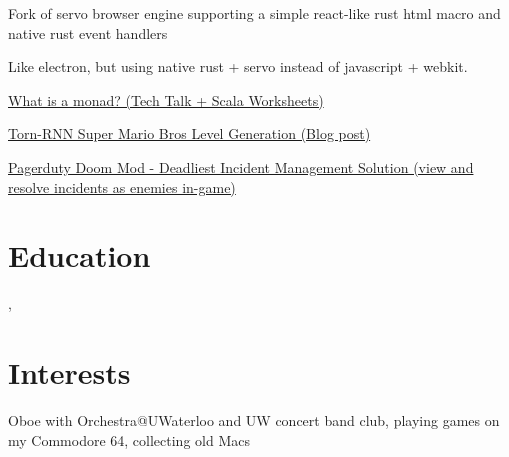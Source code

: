 \documentclass[12pt]{jmichaud-resume}
\begin{document}
\sectionsep
	
 \hfill
{}
\begin{tightemize}
	\item Fork of servo browser engine supporting a simple react-like rust html macro and native rust event handlers
	\item Like electron, but using native rust + servo instead of javascript + webkit. 
\end{tightemize}
\sectionsep
	
 \hfill
{}

\begin{minipage}[t]{0.49\textwidth}
\begin{tightemize}
	\item\href{https://github.com/justinmichaud/scala-monad-worksheets/}{What is a monad? (Tech Talk + Scala Worksheets)}
\end{tightemize}

\end{minipage}
\hfill
\begin{minipage}[t]{0.49\textwidth}
\begin{tightemize}
	\item\href{https://medium.com/@justin_michaud/super-mario-bros-level-generation-using-torch-rnn-726ddea7e9b7}{Torn-RNN Super Mario Bros Level Generation (Blog post)}
\end{tightemize}
\end{minipage}

\begin{tightemize}
	\item\href{https://github.com/justinmichaud/chocolate-doom}{Pagerduty Doom Mod - Deadliest Incident Management Solution (view and resolve incidents as enemies in-game)}
\end{tightemize}

\sectionsep

\section{Education} 
,  \hfill {}

\section{Interests}
Oboe with Orchestra@UWaterloo and UW concert band club, playing games on my Commodore 64, collecting old Macs\\
\end{document}
